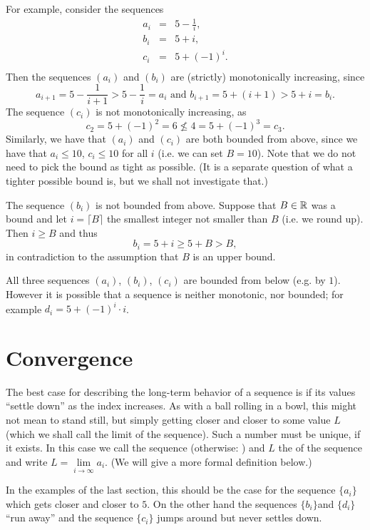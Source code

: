 For example, consider the sequences
\begin{eqnarray*}
a_i&=&5-\frac{1}{i},\\
b_i&=&5+i,\\
c_i&=&5+(-1)^i.\\
\end{eqnarray*}
Then the sequences $(a_i)$ and $(b_i)$ are (strictly) monotonically increasing, since
\[
a_{i+1}=5-\frac{1}{i+1}> 5-\frac{1}{i}=a_i
\mbox{\ and \ }
b_{i+1}=5+(i+1)> 5+i=b_i.
\]
The sequence $(c_i)$ is not monotonically increasing, as
\[
c_2=5+(-1)^2=6\not\le 4=5+(-1)^3=c_3.
\]Similarly, we have that $(a_i)$ and $(c_i)$ are both bounded from above, since we have
that $a_i\le 10$, $c_i\le 10$ for all $i$ (i.e. we can set $B=10$).
Note that we do not need to pick the bound as tight as possible. (It is a separate
question of what a tighter possible bound is, but we shall not investigate that.)

The sequence $(b_i)$ is not bounded from above. Suppose that $B\in{\mathbb R}$ was a bound and
let $i=\lceil B\rceil$ the smallest integer not smaller than $B$ (i.e. we round up).
Then $i\ge B$ and thus
\[
b_i=5+i\ge5+B>B,
\]
in contradiction to the assumption that $B$ is an upper bound.

All three sequences $(a_i)$, $(b_i)$, $(c_i)$ are bounded from below (e.g. by $1$).
However it is possible that a sequence is neither monotonic, nor bounded; for example
$d_i=5+(-1)^i\cdot i$.

\section{Convergence}
\label{seclimits}

The best case for describing the long-term behavior of a sequence is if
its values ``settle down'' as the index increases. As with a ball rolling in a bowl, this
might not mean to stand still, but simply getting
closer and closer to some value $L$ (which we shall call the limit of the sequence).
Such a number must be unique, if it exists.
In this case we call the sequence  (otherwise:
)
and $L$ the  of the
sequence and write $L=\lim\limits_{i\to\infty}a_i$. (We will give a more formal
definition below.)

In the examples of the last section, this should be the case for the sequence
$\{a_i\}$ which gets closer and closer to $5$. On the other hand the
sequences $\{b_i\} $and $\{d_i\} $ ``run away'' and the sequence $\{c_i\}$
jumps around but never settles down.

